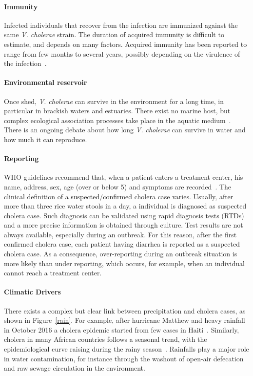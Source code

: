 \paragraph{Immunity} Infected individuals that recover from the infection are immunized against the same \textit{V. cholerae} strain. The duration of acquired immunity is difficult to estimate, and depends on many factors. Acquired immunity has been reported to range from few months to several years, possibly depending on the virulence of the infection~\cite{levine_duration_1981, king_inapparent_2008, kaper_cholera._1995, woodward_cholera_1971, glass_seroepidemiological_1985, clemens_biotype_1991}.

\paragraph{Environmental reservoir} Once shed, \textit{V. cholerae} can survive in the environment for a long time, in particular in brackish waters and estuaries. There exist no marine host, but complex ecological association processes take place in the aquatic medium~\cite{reidl_vibrio_2002, bertuzzo_space-time_2008}. There is an ongoing debate about how long  \textit{V. cholerae} can survive in water and how much it can reproduce.

\paragraph{Reporting} WHO guidelines recommend that, when a patient enters a treatment center, his name, address, sex, age (over or below 5) and symptoms are recorded~\cite{who_first_2010}. The clinical definition of a suspected/confirmed cholera case varies. Usually, after more than three rice water stools in a day, a individual is diagnosed as suspected cholera case. Such diagnosis can be validated using rapid diagnosis tests (RTDs) and a more precise information is obtained through culture. Test results are not always available, especially during an outbreak. For this reason, after the first confirmed cholera case, each patient having diarrhea is reported as a suspected cholera case.  As a consequence, over-reporting during an outbreak situation is more likely than under reporting, which occurs, for example, when an individual cannot reach a treatment center.  %

\paragraph{Climatic Drivers} There exists a complex but clear link between precipitation and cholera cases, as shown in Figure~\ref{rain}. For example, after hurricane Matthew and heavy rainfall in October 2016 a cholera epidemic started from few cases in Haiti~\cite{rinaldo_reassessment_2012, gaudart_spatio-temporal_2013}. Similarly, cholera in many African countries follows a seasonal trend, with the epidemiological curve raising during the rainy season~\cite{baracchini_seasonality_2017, pascual_cholera_2000}.  Rainfalls play a major role in water contamination, for instance through the washout of open-air defecation and raw sewage circulation in the environment.  %

